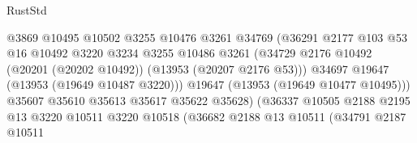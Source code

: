 \begin{lexlean}{RustStd}
\begin{coremodule}
                                            @3869
                                            @10495
                                            @10502
                                            @3255
                                            @10476
                                            @3261
                                            @34769
                                            (@36291
                                              @2177
                                              @103
                                              @53
                                              @16
                                              @10492
                                              @3220
                                              @3234
                                              @3255
                                              @10486
                                              @3261
                                              (@34729
                                                @2176
                                                @10492
                                                (@20201 (@20202 @10492))
                                                (@13953 (@20207 @2176 @53)))
                                              @34697
                                              @19647
                                              (@13953 (@19649 @10487 @3220)))
                                            @19647
                                            (@13953 (@19649 @10477 @10495)))
                                          @35607
                                          @35610
                                          @35613
                                          @35617
                                          @35622
                                          @35628)
                                        (@36337
                                          @10505
                                          @2188
                                          @2195
                                          @13
                                          @3220
                                          @10511
                                          @3220
                                          @10518
                                          (@36682
                                            @2188
                                            @13
                                            @10511
                                            (@34791
                                              @2187
                                              @10511

\end{coremodule}
\end{lexlean}
